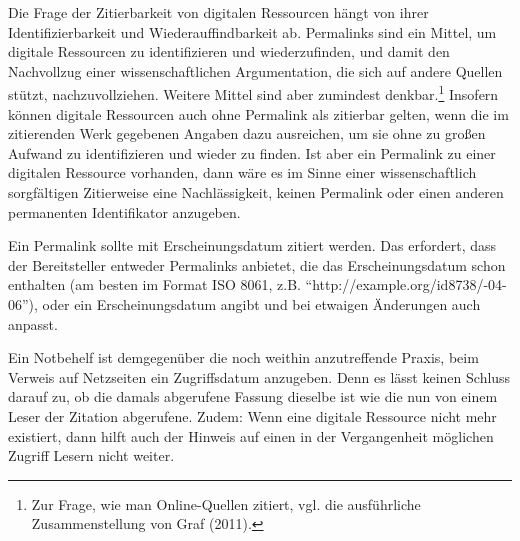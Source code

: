 \documentclass[12pt, a4paper]{article}
\begin{document}
Die Frage der Zitierbarkeit von digitalen Ressourcen hängt von ihrer
Identifizierbarkeit und Wiederauffindbarkeit ab. Permalinks sind ein
Mittel, um digitale Ressourcen zu identifizieren und wiederzufinden,
und damit den Nachvollzug einer wissenschaftlichen Argumentation, die
sich auf andere Quellen stützt, nachzuvollziehen. Weitere Mittel sind
aber zumindest denkbar.\footnote{Zur Frage, wie man Online-Quellen
  zitiert, vgl. die ausführliche Zusammenstellung von Graf
  (2011).}  Insofern können digitale Ressourcen auch ohne Permalink
als zitierbar gelten, wenn die im zitierenden Werk gegebenen Angaben
dazu ausreichen, um sie ohne zu großen Aufwand zu identifizieren und
wieder zu finden.  Ist aber ein Permalink zu einer digitalen Ressource
vorhanden, dann wäre es im Sinne einer wissenschaftlich sorgfältigen
Zitierweise eine Nachlässigkeit, keinen Permalink oder einen anderen
permanenten Identifikator anzugeben.

Ein Permalink sollte mit Erscheinungsdatum zitiert werden.
Das erfordert, dass der Bereitsteller entweder Permalinks anbietet,
die das Erscheinungsdatum schon enthalten (am besten im Format ISO 8061,
z.B. ``http://example.org/\-id8738/-04-06''), oder ein Erscheinungsdatum
angibt und bei etwaigen Änderungen auch anpasst.

Ein Notbehelf ist demgegenüber die noch weithin anzutreffende Praxis,
beim Verweis auf Netzseiten ein Zugriffsdatum anzugeben. Denn es lässt
keinen Schluss darauf zu, ob die damals abgerufene Fassung dieselbe
ist wie die nun von einem Leser der Zitation abgerufene. Zudem: Wenn eine
digitale Ressource nicht mehr existiert, dann hilft auch der Hinweis auf einen
in der Vergangenheit möglichen Zugriff Lesern nicht weiter.
\end{document}
